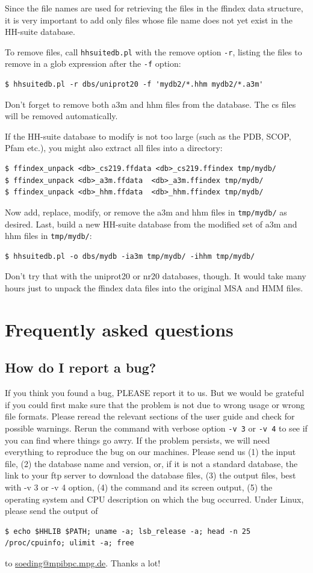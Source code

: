 \documentclass[11pt,a4paper]{article}
\begin{document}
Since the file names are used for retrieving the files in the ffindex data structure, it is very important to add only files whose file name does not yet exist in the HH-suite database.

To remove files, call \verb`hhsuitedb.pl` with the remove option \verb`-r`, listing the files to remove in a glob expression after the \verb`-f` option:
\begin{verbatim}
$ hhsuitedb.pl -r dbs/uniprot20 -f 'mydb2/*.hhm mydb2/*.a3m' 
\end{verbatim}
Don't forget to remove both a3m and hhm files from the database. The cs files will be removed automatically.

If the HH-suite database to modify is not too large (such as the PDB, SCOP, Pfam etc.), you might also extract all files into a directory:
\begin{verbatim}
$ ffindex_unpack <db>_cs219.ffdata <db>_cs219.ffindex tmp/mydb/
$ ffindex_unpack <db>_a3m.ffdata  <db>_a3m.ffindex tmp/mydb/
$ ffindex_unpack <db>_hhm.ffdata  <db>_hhm.ffindex tmp/mydb/ 
\end{verbatim}
Now add, replace, modify, or remove  the a3m and hhm files in \verb`tmp/mydb/` as desired. Last, build a new HH-suite database from the modified set of a3m and hhm files in \verb`tmp/mydb/`:
\begin{verbatim}
$ hhsuitedb.pl -o dbs/mydb -ia3m tmp/mydb/ -ihhm tmp/mydb/
\end{verbatim}
Don't try that with the uniprot20 or nr20 databases, though. It would take many hours just to unpack the ffindex data files into the original MSA and HMM files.


\section{Frequently asked questions}

\subsection{How do I report a bug? \label{report-bug}}
If you think you found a bug, PLEASE report it to us. But we would be grateful if you could first make sure that the problem is not due to wrong usage or wrong file formats. Please reread the relevant sections of the user guide and check for possible warnings. Rerun the command with verbose option \verb`-v 3` or \verb`-v 4` to see if you can find where things go awry. If the problem persists, we will need everything to reproduce the bug on our machines. Please send us (1) the input file, (2) the database name and version, or, if it is not a standard database, the link to your ftp server to download the database files, (3) the output files, best with -v 3 or -v 4 option, (4) the command and its screen output, (5) the operating system and CPU description on which the bug occurred. Under Linux, please send the output of 
\small
\begin{verbatim}
$ echo $HHLIB $PATH; uname -a; lsb_release -a; head -n 25 /proc/cpuinfo; ulimit -a; free
\end{verbatim}
\normalsize
to \url{soeding@mpibpc.mpg.de}. Thanks a lot!
\end{document}
